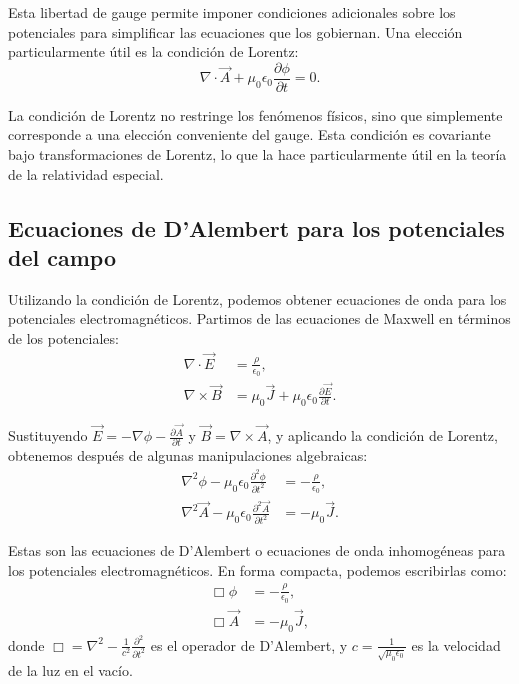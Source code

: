 \documentclass[12pt,a4paper]{book}
\begin{document}
Esta libertad de gauge permite imponer condiciones adicionales sobre los potenciales para simplificar las ecuaciones que los gobiernan. Una elección particularmente útil es la condición de Lorentz:
\begin{equation}
\nabla \cdot \vec{A} + \mu_0 \epsilon_0 \frac{\partial \phi}{\partial t} = 0.
\end{equation}

La condición de Lorentz no restringe los fenómenos físicos, sino que simplemente corresponde a una elección conveniente del gauge. Esta condición es covariante bajo transformaciones de Lorentz, lo que la hace particularmente útil en la teoría de la relatividad especial.

\subsection{Ecuaciones de D'Alembert para los potenciales del campo}

Utilizando la condición de Lorentz, podemos obtener ecuaciones de onda para los potenciales electromagnéticos. Partimos de las ecuaciones de Maxwell en términos de los potenciales:
\begin{align}
\nabla \cdot \vec{E} &= \frac{\rho}{\epsilon_0}, \\
\nabla \times \vec{B} &= \mu_0 \vec{J} + \mu_0 \epsilon_0 \frac{\partial \vec{E}}{\partial t}.
\end{align}

Sustituyendo $\vec{E} = -\nabla \phi - \frac{\partial \vec{A}}{\partial t}$ y $\vec{B} = \nabla \times \vec{A}$, y aplicando la condición de Lorentz, obtenemos después de algunas manipulaciones algebraicas:
\begin{align}
\nabla^2 \phi - \mu_0 \epsilon_0 \frac{\partial^2 \phi}{\partial t^2} &= -\frac{\rho}{\epsilon_0}, \\
\nabla^2 \vec{A} - \mu_0 \epsilon_0 \frac{\partial^2 \vec{A}}{\partial t^2} &= -\mu_0 \vec{J}.
\end{align}

Estas son las ecuaciones de D'Alembert o ecuaciones de onda inhomogéneas para los potenciales electromagnéticos. En forma compacta, podemos escribirlas como:
\begin{align}
\Box \phi &= -\frac{\rho}{\epsilon_0}, \\
\Box \vec{A} &= -\mu_0 \vec{J},
\end{align}
donde $\Box = \nabla^2 - \frac{1}{c^2}\frac{\partial^2}{\partial t^2}$ es el operador de D'Alembert, y $c = \frac{1}{\sqrt{\mu_0 \epsilon_0}}$ es la velocidad de la luz en el vacío.
\end{document}
